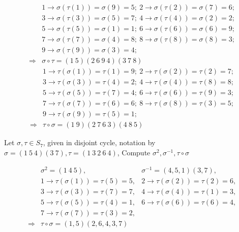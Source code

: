 \documentclass[11pt]{elegantbook}
\begin{document}
\begin{equation}
    \begin{aligned}
        &1 \rightarrow \sigma(\tau(1))=\sigma(9)=5;\ 
        2 \rightarrow \sigma(\tau(2))=\sigma(7)=6;\\
        &3 \rightarrow \sigma(\tau(3))=\sigma(5)=7;\ 
        4 \rightarrow \sigma(\tau(4))=\sigma(2)=2;\\
        &5 \rightarrow \sigma(\tau(5))=\sigma(1)=1;\ 
        6 \rightarrow \sigma(\tau(6))=\sigma(6)=9;\\
        &7 \rightarrow \sigma(\tau(7))=\sigma(4)=8;\ 
        8 \rightarrow \sigma(\tau(8))=\sigma(8)=3;\\
        &9 \rightarrow \sigma(\tau(9))=\sigma(3)=4;\\
        \Rightarrow	&\sigma\circ\tau=(1\ 5)(2\ 6\ 9\ 4)(3\ 7\ 8)
    \end{aligned}
    \nonumber
\end{equation}
\begin{equation}
    \begin{aligned}
        &1 \rightarrow \tau(\sigma(1))=\tau(1)=9;\ 
        2 \rightarrow \tau(\sigma(2))=\tau(2)=7;\\
        &3 \rightarrow \tau(\sigma(3))=\tau(4)=2;\ 
        4 \rightarrow \tau(\sigma(4))=\tau(8)=8;\\
        &5 \rightarrow \tau(\sigma(5))=\tau(7)=4;\ 
        6 \rightarrow \tau(\sigma(6))=\tau(9)=3;\\
        &7 \rightarrow \tau(\sigma(7))=\tau(6)=6;\ 
        8 \rightarrow \tau(\sigma(8))=\tau(3)=5;\\
        &9 \rightarrow \tau(\sigma(9))=\tau(5)=1;\\
        \Rightarrow	&\tau\circ\sigma=(1\ 9)(2\ 7\ 6\ 3)(4\ 8\ 5)
    \end{aligned}
    \nonumber
\end{equation}
\begin{example}
    Let $\sigma,\tau \in S_7$, given in disjoint cycle,
    notation by
    $\sigma = (1\ 5\ 4)(3\ 7),
    \tau = (1\ 3\ 2\ 6\ 4)$,
    Compute
    $\sigma^2 ,
    \sigma^{-1} ,
    \tau\circ \sigma$
\end{example}
\begin{equation}
    \begin{aligned}
        &\sigma^2=(1\ 4\ 5),&\sigma^{-1}=(4,5,1)(3,7),\\
        &1 \rightarrow	\tau(\sigma(1))=\tau(5)=5,
        &2 \rightarrow	\tau(\sigma(2))=\tau(2)=6,\\
        &3 \rightarrow	\tau(\sigma(3))=\tau(7)=7,
        &4 \rightarrow	\tau(\sigma(4))=\tau(1)=3,\\
        &5 \rightarrow	\tau(\sigma(5))=\tau(4)=1,
        &6 \rightarrow	\tau(\sigma(6))=\tau(6)=4,\\
        &7 \rightarrow	\tau(\sigma(7))=\tau(3)=2,\\
        \Rightarrow	& \tau\circ \sigma=(1,5)(2,6,4,3,7)
    \end{aligned}
    \nonumber
\end{equation}
\end{document}
